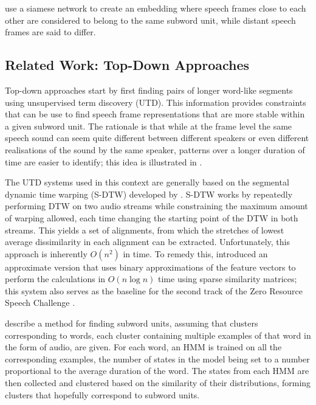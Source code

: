 \textcite{synnaeve2016temporal} use a siamese network \parencite{bromley1994signature} to create an embedding where speech frames close to each other are considered to belong to the same subword unit, while distant speech frames are said to differ.

\subsection{Related Work: Top-Down Approaches}
Top-down approaches start by first finding pairs of longer word-like segments using unsupervised term discovery (UTD).
This information provides constraints that can be use to find speech frame representations that are more stable within a given subword unit.
The rationale is that while at the frame level the same speech sound can seem quite different between different speakers or even different realisations of the sound by the same speaker, patterns over a longer duration of time are easier to identify; this idea is illustrated in \textcite{jansen2013weak}.

The UTD systems used in this context are generally based on the segmental dynamic time warping (S-DTW) developed by \textcite{park2008unsupervised}.
S-DTW works by repeatedly performing DTW on two audio streams while constraining the maximum amount of warping allowed, each time changing the starting point of the DTW in both streams.
This yields a set of alignments, from which the stretches of lowest average dissimilarity in each alignment can be extracted.
Unfortunately, this approach is inherently $O(n^2)$ in time.
To remedy this, \textcite{jansen2011efficient} introduced an approximate version that uses binary approximations of the feature vectors to perform the calculations in $O(n \log n)$ time using sparse similarity matrices; this system also serves as the baseline for the second track of the Zero Resource Speech Challenge \parencite{versteegh2015zero}.

\textcite{jansen2011towards} describe a method for finding subword units, assuming that clusters corresponding to words, each cluster containing multiple examples of that word in the form of audio, are given.
For each word, an HMM is trained on all the corresponding examples, the number of states in the model being set to a number proportional to the average duration of the word.
The states from each HMM are then collected and clustered based on the similarity of their distributions, forming clusters that hopefully correspond to subword units.

